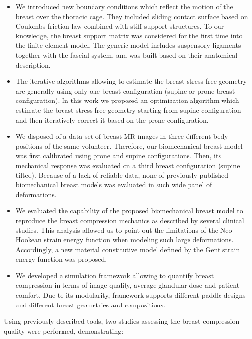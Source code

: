 \begin{itemize}
\item We introduced new boundary conditions which reflect the motion of the breast over the thoracic cage.  They included sliding contact surface based on Coulombs friction law combined with stiff support structures. To our knowledge,  the breast support matrix was considered for the first time into the finite element model. The generic model includes suspensory ligaments together with the fascial system, and was built based on their anatomical description.   

\item The iterative algorithms allowing to estimate the breast stress-free  geometry are generally using only one breast configuration (supine or prone breast configuration). In this work we proposed an optimization algorithm which estimate the breast stress-free geometry starting from supine configuration and then iteratively correct it based on the prone configuration. 

\item  We disposed of a data set of breast MR images in three different body positions of the same volunteer. Therefore, our biomechanical breast model was first calibrated using prone and supine configurations. Then, its mechanical response was evaluated on a third breast configuration (supine tilted). Because of a lack of reliable data, none of previously published biomechanical breast models was evaluated in such wide panel of deformations.  

\item We evaluated the capability of the proposed biomechanical breast model to reproduce the breast compression mechanics as described by several clinical studies.  This analysis allowed us to point out the limitations of the Neo-Hookean strain energy function when modeling such large deformations.  Accordingly, a new material constitutive model defined by the Gent strain energy function was proposed.


\item We developed a simulation framework allowing to quantify breast compression in terms of image quality, average glandular dose and patient comfort. Due to its modularity, framework supports different paddle designs and different breast geometries and compositions. 
\end{itemize}

Using previously described tools, two studies assessing the breast compression quality were performed, demonstrating:


